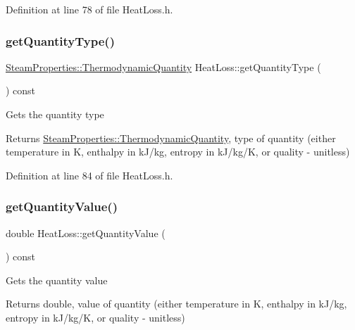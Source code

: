 Definition at line 78 of file Heat\+Loss.\+h.

\mbox{\label{class_heat_loss_a92dc973c0fd81df192207b3df55d6c2b}} 
\subsubsection{\texorpdfstring{get\+Quantity\+Type()}{getQuantityType()}}
{\footnotesize\ttfamily \hyperlink{class_steam_properties_ae0294bedf7d178c2d8fb6aed0f62fbff}{Steam\+Properties\+::\+Thermodynamic\+Quantity} Heat\+Loss\+::get\+Quantity\+Type (\begin{DoxyParamCaption}{ }\end{DoxyParamCaption}) const\hspace{0.3cm}{\ttfamily [inline]}}

Gets the quantity type \begin{DoxyReturn}{Returns}
\hyperlink{class_steam_properties_ae0294bedf7d178c2d8fb6aed0f62fbff}{Steam\+Properties\+::\+Thermodynamic\+Quantity}, type of quantity (either temperature in K, enthalpy in k\+J/kg, entropy in k\+J/kg/K, or quality -\/ unitless) 
\end{DoxyReturn}


Definition at line 84 of file Heat\+Loss.\+h.

\mbox{\label{class_heat_loss_a7f7fd85e4fc8bf96dcc213f3dd44ecf7}} 
\subsubsection{\texorpdfstring{get\+Quantity\+Value()}{getQuantityValue()}}
{\footnotesize\ttfamily double Heat\+Loss\+::get\+Quantity\+Value (\begin{DoxyParamCaption}{ }\end{DoxyParamCaption}) const\hspace{0.3cm}{\ttfamily [inline]}}

Gets the quantity value \begin{DoxyReturn}{Returns}
double, value of quantity (either temperature in K, enthalpy in k\+J/kg, entropy in k\+J/kg/K, or quality -\/ unitless) 
\end{DoxyReturn}


